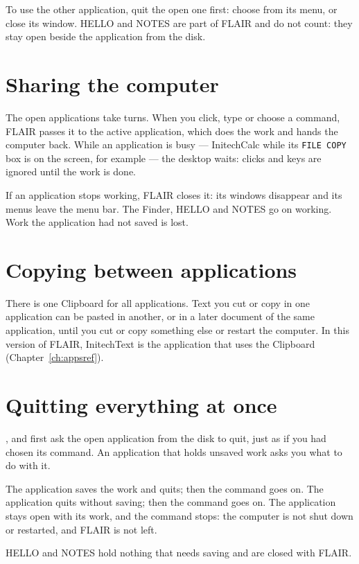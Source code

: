 To use the other application, quit the open one first: choose
 from its  menu, or close its window.  HELLO
and NOTES are part of FLAIR and do not count: they stay open beside the
application from the disk.

\section{Sharing the computer}
The open applications take turns.  When you click, type or choose a
command, FLAIR passes it to the active application, which does the work and
hands the computer back.  While an application is busy --- InitechCalc
while its \texttt{FILE COPY} box is on the screen, for example --- the
desktop waits: clicks and keys are ignored until the work is done.

If an application stops working, FLAIR closes it: its windows disappear and
its menus leave the menu bar.  The Finder, HELLO and NOTES go on working.
Work the application had not saved is lost.

\section{Copying between applications}
There is one Clipboard for all applications.  Text you cut or copy in one
application can be pasted in another, or in a later document of the same
application, until you cut or copy something else or restart the computer.
In this version of FLAIR, InitechText is the application that uses the
Clipboard (Chapter~\ref{ch:appsref}).

\section{Quitting everything at once}
,  and 
first ask the open application from the disk to quit, just as if you had
chosen its  command.  An application that holds unsaved
work asks you what to do with it.


The application saves the work and quits; then the command
goes on.
The application quits without saving; then the
command goes on.
The application stays open with its work, and the command
stops: the computer is not shut down or restarted, and FLAIR is not left.

HELLO and NOTES hold nothing that needs saving and are closed with FLAIR.
